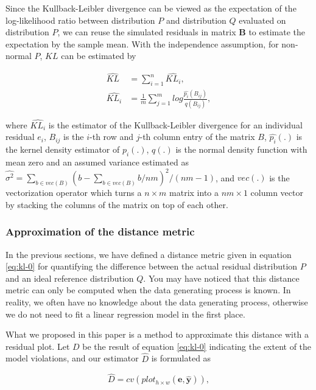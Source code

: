 \documentclass[]{interact}
\theoremstyle{plain}%
\theoremstyle{definition}
\theoremstyle{remark}
\begin{document}
Since the Kullback-Leibler divergence can be viewed as the expectation
of the log-likelihood ratio between distribution \(P\) and distribution
\(Q\) evaluated on distribution \(P\), we can reuse the simulated
residuals in matrix \(\boldsymbol{B}\) to estimate the expectation by
the sample mean. With the independence assumption, for non-normal \(P\),
\(KL\) can be estimated by

\begin{align}
\label{eq:kl-3}
\hat{KL} &= \sum_{i = 1}^{n} \hat{KL_i}, \\
\hat{KL_i} &= \frac{1}{m}\sum_{j = 1}^{m} log\frac{\hat{p_i}(B_{ij})}{q(B_{ij})},
\end{align}

\noindent where \(\hat{KL_i}\) is the estimator of the Kullback-Leibler
divergence for an individual residual \(e_i\), \(B_{ij}\) is the
\(i\)-th row and \(j\)-th column entry of the matrix \(B\),
\(\hat{p_i}(.)\) is the kernel density estimator of \(p_i(.)\), \(q(.)\)
is the normal density function with mean zero and an assumed variance
estimated as
\(\hat{\sigma^2} = \sum_{b \in vec(B)}(b - \sum_{b \in vec(B)} b/nm)^2/(nm - 1)\),
and \(vec(.)\) is the vectorization operator which turns a
\(n \times m\) matrix into a \(nm \times 1\) column vector by stacking
the columns of the matrix on top of each other.

\hypertarget{approximation-of-the-distance-metric}{%
\subsubsection{Approximation of the distance
metric}\label{approximation-of-the-distance-metric}}

In the previous sections, we have defined a distance metric given in
equation \ref{eq:kl-0} for quantifying the difference between the actual
residual distribution \(P\) and an ideal reference distribution \(Q\).
You may have noticed that this distance metric can only be computed when
the data generating process is known. In reality, we often have no
knowledge about the data generating process, otherwise we do not need to
fit a linear regression model in the first place.

What we proposed in this paper is a method to approximate this distance
with a residual plot. Let \(D\) be the result of equation \ref{eq:kl-0}
indicating the extent of the model violations, and our estimator
\(\hat{D}\) is formulated as

\begin{equation}
\label{eq:d-approx}
\hat{D} = cv(plot_{h\times w}(\boldsymbol{e}, \hat{\boldsymbol{y}})),
\end{equation}
\end{document}
